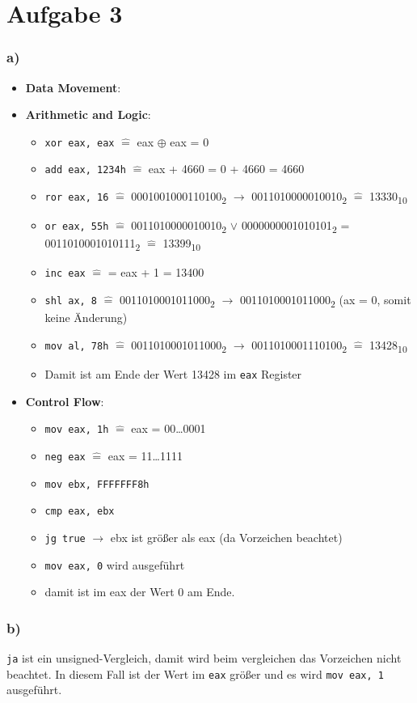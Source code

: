 \documentclass[]{scrreprt}
\begin{document}
\chapter{Aufgabe 3}
\subsection*{a)}
\begin{itemize}
	\item \textbf{Data Movement}:
	
	\item  \textbf{Arithmetic and Logic}:
	\begin{itemize}
		\item \texttt{xor eax, eax} $\hat{=}$ eax $\oplus$ eax = 0
		\item \texttt{add eax, 1234h} $\hat{=}$ eax + 4660 = 0 + 4660 = 4660
		\item \texttt{ror eax, 16} $\hat{=}$ {0001001000110100}\textsubscript{2} $\rightarrow$ {0011010000010010}\textsubscript{2} $\hat{=}$  {13330}\textsubscript{10}
		\item \texttt{or eax, 55h} $\hat{=}$ {0011010000010010}\textsubscript{2} $\vee$ {0000000001010101}\textsubscript{2} = {0011010001010111}\textsubscript{2} $\hat{=}$ {13399}\textsubscript{10}
		\item \texttt{inc eax} $\hat{=}$ = eax + 1 = 13400
		\item \texttt{shl ax, 8} $\hat{=}$ 0011010001011000\textsubscript{2} $\rightarrow$ 0011010001011000\textsubscript{2} (ax = 0, somit keine Änderung)
		\item  \texttt{mov al, 78h} $\hat{=}$ 0011010001011000\textsubscript{2} $\rightarrow$ 0011010001110100\textsubscript{2} $\hat{=}$ 13428\textsubscript{10}
		\item Damit ist am Ende der Wert 13428 im \texttt{eax} Register
	\end{itemize}
	
	\item \textbf{Control Flow}:
	\begin{itemize}
		\item \texttt{mov eax, 1h} $\hat{=}$ eax = 00\dots0001
		\item \texttt{neg eax} $\hat{=}$ eax = 11\dots1111
		\item \texttt{mov ebx, FFFFFFF8h}
		\item \texttt{cmp eax, ebx} 
		\item \texttt{jg true} $\rightarrow$ ebx ist größer als eax (da Vorzeichen beachtet)
		\item \texttt{mov eax, 0} wird ausgeführt
		\item damit ist im eax der Wert 0 am Ende.
	\end{itemize}
\end{itemize}
\subsection*{b)}
\texttt{ja} ist ein unsigned-Vergleich, damit wird beim vergleichen das Vorzeichen nicht beachtet. In diesem Fall ist der Wert im \texttt{eax} größer und es wird \texttt{mov eax, 1} ausgeführt.
\end{document}
